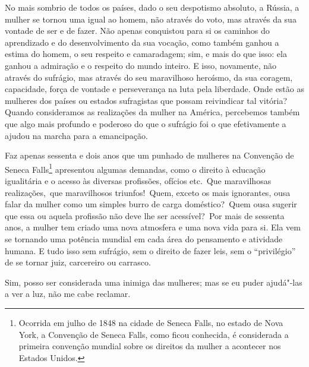 No mais sombrio de todos os países, dado o seu despotismo absoluto, a
Rússia, a mulher se tornou uma igual ao homem, não através do voto, mas
através da sua vontade de ser e de fazer. Não apenas conquistou para
si os caminhos do aprendizado e do desenvolvimento da sua vocação,
como também ganhou a estima do homem, o seu respeito e camaradagem; sim, e
mais do que isso: ela ganhou a admiração e o respeito do mundo inteiro.
E isso, novamente, não através do sufrágio, mas através do seu
maravilhoso heroísmo, da sua coragem, capacidade, força de vontade e
perseverança na luta pela liberdade. Onde estão as mulheres dos países
ou estados sufragistas que possam reivindicar tal vitória? Quando
consideramos as realizações da mulher na América, percebemos também que
algo mais profundo e poderoso do que o sufrágio foi o que efetivamente a
ajudou na marcha para a emancipação.

Faz apenas sessenta e dois anos que um punhado de mulheres na Convenção
de Seneca Falls\footnote{Ocorrida em julho de 1848 na cidade de Seneca Falls, no estado de Nova York, a Convenção de Seneca Falls, como ficou conhecida, é considerada a primeira convenção mundial sobre os direitos da mulher a acontecer nos Estados Unidos.} apresentou algumas demandas, como o direito à educação igualitária e o acesso às diversas
profissões, ofícios etc.~Que maravilhosas realizações,~que maravilhosos
triunfos!~Quem, exceto os mais ignorantes, ousa falar da mulher como um
simples burro de carga doméstico?~Quem ousa sugerir que essa ou aquela
profissão não deve lhe ser acessível?~Por mais de sessenta anos, a
mulher tem criado uma nova atmosfera e uma nova vida para si. Ela vem se
tornando uma potência mundial em cada área do pensamento e atividade
humana. E tudo isso sem sufrágio, sem o direito de fazer leis, sem o
``privilégio'' de se tornar juiz, carcereiro ou carrasco.

Sim, posso ser considerada uma inimiga das mulheres; mas se eu puder
ajudá"-las a ver a luz, não me cabe reclamar.


